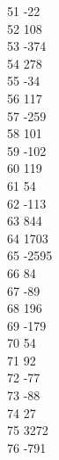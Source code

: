 { 51	-22 \\
 52	108 \\
 53	-374 \\
 54	278 \\
 55	-34 \\
 56	117 \\
 57	-259 \\
 58	101 \\
 59	-102 \\
 60	119 \\
 61	54 \\
 62	-113 \\
 63	844 \\
 64	1703 \\
 65	-2595 \\
 66	84 \\
 67	-89 \\
 68	196 \\
 69	-179 \\
 70	54 \\
 71	92 \\
 72	-77 \\
 73	-88 \\
 74	27 \\
 75	3272 \\
 76	-791 \\
}
